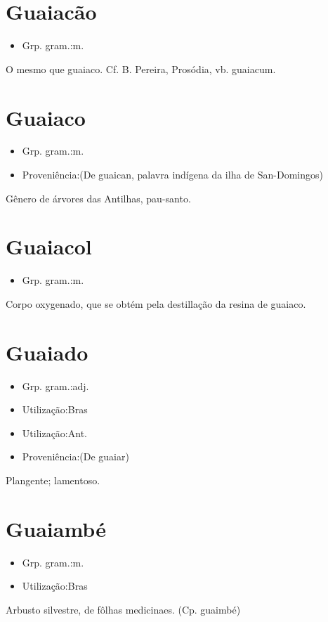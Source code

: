 \section{Guaiacão}
\begin{itemize}
\item {Grp. gram.:m.}
\end{itemize}
O mesmo que \textunderscore guaiaco\textunderscore . Cf. B. Pereira, \textunderscore Prosódia\textunderscore , vb. \textunderscore guaiacum\textunderscore .
\section{Guaiaco}
\begin{itemize}
\item {Grp. gram.:m.}
\end{itemize}
\begin{itemize}
\item {Proveniência:(De \textunderscore guaican\textunderscore , palavra indígena da ilha de San-Domingos)}
\end{itemize}
Gênero de árvores das Antilhas, pau-santo.
\section{Guaiacol}
\begin{itemize}
\item {Grp. gram.:m.}
\end{itemize}
Corpo oxygenado, que se obtém pela destillação da resina de guaiaco.
\section{Guaiado}
\begin{itemize}
\item {Grp. gram.:adj.}
\end{itemize}
\begin{itemize}
\item {Utilização:Bras}
\end{itemize}
\begin{itemize}
\item {Utilização:Ant.}
\end{itemize}
\begin{itemize}
\item {Proveniência:(De \textunderscore guaiar\textunderscore )}
\end{itemize}
Plangente; lamentoso.
\section{Guaiambé}
\begin{itemize}
\item {Grp. gram.:m.}
\end{itemize}
\begin{itemize}
\item {Utilização:Bras}
\end{itemize}
Arbusto silvestre, de fôlhas medicinaes.
(Cp. \textunderscore guaimbé\textunderscore )
